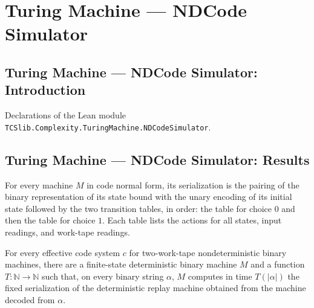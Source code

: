 \section{Turing Machine --- NDCode Simulator}
\subsection*{Turing Machine --- NDCode Simulator: Introduction}

Declarations of the Lean module \texttt{TCSlib.Complexity.TuringMachine.NDCodeSimulator}.

\subsection*{Turing Machine --- NDCode Simulator: Results}

\begin{theorem}
\label{Turing.CodeNDTM.serialize_eq_tableBitsK}
\leanok
{}
For every machine $M$ in code normal form, its serialization is the pairing of the
binary representation of its state bound with the unary encoding of its initial state
followed by the two transition tables, in order: the table for choice $0$ and then the
table for choice $1$. Each table lists the actions for all states, input readings, and
work-tape readings.
\end{theorem}

\begin{theorem}
\label{Turing.exists_replayCanonizer}
\leanok
{}
For every effective code system $c$ for two-work-tape nondeterministic binary machines,
there are a finite-state deterministic binary machine $M$ and a function
$T:\mathbb{N}\to\mathbb{N}$ such that, on every binary string $\alpha$, $M$ computes in
time $T(|\alpha|)$ the fixed serialization of the deterministic replay machine obtained
from the machine decoded from $\alpha$.
\end{theorem}

